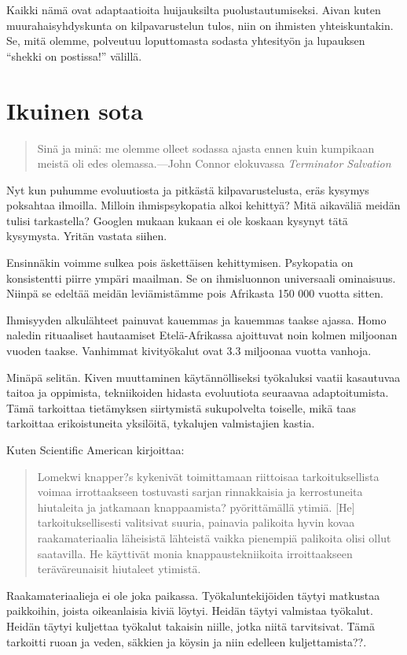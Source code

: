 Kaikki nämä ovat adaptaatioita huijauksilta puolustautumiseksi. Aivan kuten muurahaisyhdyskunta on kilpavarustelun tulos, niin on ihmisten yhteiskuntakin. Se, mitä olemme, polveutuu loputtomasta sodasta yhtesityön ja lupauksen ``shekki on postissa!'' välillä.

\section{Ikuinen sota}
\begin{quotation}
\noindent Sinä ja minä: me olemme olleet sodassa ajasta ennen kuin kumpikaan meistä oli edes olemassa.\newline---John Connor elokuvassa \emph{Terminator Salvation}
\end{quotation}
Nyt kun puhumme evoluutiosta ja pitkästä kilpavarustelusta, eräs kysymys poksahtaa ilmoilla. Milloin ihmispsykopatia alkoi kehittyä? Mitä aikaväliä meidän tulisi tarkastella? Googlen mukaan kukaan ei ole koskaan kysynyt tätä kysymysta. Yritän vastata siihen.

Ensinnäkin voimme sulkea pois äskettäisen kehittymisen. Psykopatia on konsistentti piirre ympäri maailman. Se on ihmisluonnon universaali ominaisuus. Niinpä se edeltää meidän leviämistämme pois Afrikasta 150 000 vuotta sitten.

Ihmisyyden alkulähteet painuvat kauemmas ja kauemmas taakse ajassa. Homo naledin rituaaliset hautaamiset Etelä-Afrikassa ajoittuvat noin kolmen miljoonan vuoden taakse. Vanhimmat kivityökalut ovat 3.3 miljoonaa vuotta vanhoja.

Minäpä selitän. Kiven muuttaminen käytännölliseksi työkaluksi vaatii kasautuvaa taitoa ja oppimista, tekniikoiden hidasta evoluutiota seuraavaa adaptoitumista. Tämä tarkoittaa tietämyksen siirtymistä sukupolvelta toiselle, mikä taas tarkoittaa erikoistuneita yksilöitä, tykalujen valmistajien kastia.

Kuten Scientific American kirjoittaa:
\begin{quotation}
\noindent Lomekwi knapper?s kykenivät toimittamaan riittoisaa tarkoituksellista voimaa irrottaakseen tostuvasti sarjan rinnakkaisia ja kerrostuneita hiutaleita ja jatkamaan knappaamista? pyörittämällä ytimiä. [He] tarkoituksellisesti valitsivat suuria, painavia palikoita hyvin kovaa raakamateriaalia läheisistä lähteistä vaikka pienempiä palikoita olisi ollut saatavilla. He käyttivät monia knappaustekniikoita irroittaakseen teräväreunaisit hiutaleet ytimistä.
\end{quotation}
Raakamateriaalieja ei ole joka paikassa. Työkaluntekijöiden täytyi matkustaa paikkoihin, joista oikeanlaisia kiviä löytyi. Heidän täytyi valmistaa työkalut. Heidän täytyi kuljettaa työkalut takaisin niille, jotka niitä tarvitsivat. Tämä tarkoitti ruoan ja veden, säkkien ja köysin ja niin edelleen kuljettamista??.

